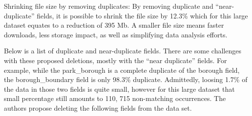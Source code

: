 \documentclass[12pt, titlepage]{article}
\begin{document}

 \label{sec:filesize}
Shrinking file size by removing duplicates: By removing duplicate 
and ``near-duplicate'' fields, it is possible to 
shrink the file size by 12.3\% which for this large dataset equates to a 
reduction of 395 Mb. A smaller file size means faster downloads, 
less storage impact, as well as simplifying data analysis efforts.  
 
 
Below is a list of duplicate and near-duplicate fields. There are 
some challenges with these proposed deletions, mostly with 
the ``near duplicate'' fields.  For example, while the park\_borough is 
a complete duplicate of the borough field, the 
borough\_boundary field is only 98.3\% duplicate. Admittedly, 
loosing 1.7\% of the data in those two fields is quite small, however
for this large dataset that small percentage still amounts 
to 110, 715 non-matching occurrences. The authors  propose 
deleting the following fields from the data set.
 
\end{document}
